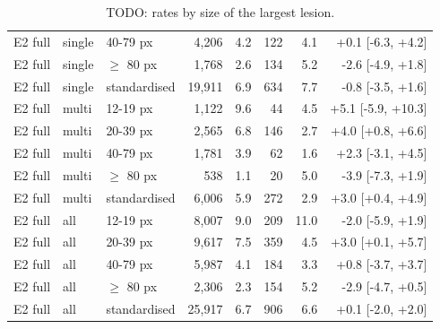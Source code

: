 \begin{table}
\begin{tabular}{lllrrrrr}
E2 full & single & 40-79 px & 4,206 & 4.2 & 122 & 4.1 & +0.1 [-6.3, +4.2] \\
E2 full & single & $\geq$ 80 px & 1,768 & 2.6 & 134 & 5.2 & -2.6 [-4.9, +1.8] \\
E2 full & single & standardised & 19,911 & 6.9 & 634 & 7.7 & -0.8 [-3.5, +1.6] \\
E2 full & multi & 12-19 px & 1,122 & 9.6 & 44 & 4.5 & +5.1 [-5.9, +10.3] \\
E2 full & multi & 20-39 px & 2,565 & 6.8 & 146 & 2.7 & +4.0 [+0.8, +6.6] \\
E2 full & multi & 40-79 px & 1,781 & 3.9 & 62 & 1.6 & +2.3 [-3.1, +4.5] \\
E2 full & multi & $\geq$ 80 px & 538 & 1.1 & 20 & 5.0 & -3.9 [-7.3, +1.9] \\
E2 full & multi & standardised & 6,006 & 5.9 & 272 & 2.9 & +3.0 [+0.4, +4.9] \\
E2 full & all & 12-19 px & 8,007 & 9.0 & 209 & 11.0 & -2.0 [-5.9, +1.9] \\
E2 full & all & 20-39 px & 9,617 & 7.5 & 359 & 4.5 & +3.0 [+0.1, +5.7] \\
E2 full & all & 40-79 px & 5,987 & 4.1 & 184 & 3.3 & +0.8 [-3.7, +3.7] \\
E2 full & all & $\geq$ 80 px & 2,306 & 2.3 & 154 & 5.2 & -2.9 [-4.7, +0.5] \\
E2 full & all & standardised & 25,917 & 6.7 & 906 & 6.6 & +0.1 [-2.0, +2.0] \\
\bottomrule
\end{tabular}
\caption{TODO: rates by size of the largest lesion.}
\label{tab:rates_by_size}
\end{table}
